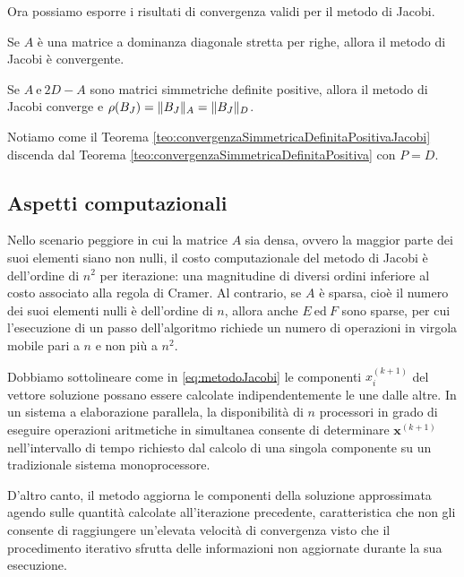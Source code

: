 Ora possiamo esporre i risultati di convergenza validi per il metodo di Jacobi.
\begin{teorema}
    \label{teo:convergenzaDominanzaDiagonaleStretta}
    Se $A$ \`e una matrice a dominanza diagonale stretta per righe, allora il metodo di Jacobi \`e convergente.
\end{teorema}
\begin{teorema}
    \label{teo:convergenzaSimmetricaDefinitaPositivaJacobi}
    Se $A \ \text{e} \ 2D - A$ sono matrici simmetriche definite positive, allora il metodo di Jacobi converge e $\rho(B_{J}) = \lVert B_{J}\rVert_{A} = \lVert B_{J}\rVert_{D}$.
\end{teorema}
Notiamo come il Teorema \ref{teo:convergenzaSimmetricaDefinitaPositivaJacobi} discenda dal Teorema \ref{teo:convergenzaSimmetricaDefinitaPositiva} con $P = D$.
\subsection{Aspetti computazionali}
Nello scenario peggiore in cui la matrice $A$ sia densa, ovvero la maggior parte dei suoi elementi siano non nulli,
il costo computazionale del metodo di Jacobi \`e dell'ordine di $n^{2}$ \si{\flops} per iterazione: una magnitudine di diversi ordini inferiore
al costo associato alla regola di Cramer.\newline
Al contrario, se $A$ \`e sparsa, cio\`e il numero dei suoi elementi nulli \`e dell'ordine di $n$, allora anche $E \ \text{ed} \ F$
sono sparse, per cui l'esecuzione di un passo dell'algoritmo richiede un numero di operazioni in virgola mobile pari a $n$ e non
pi\`u a $n^2$.

Dobbiamo sottolineare come in \eqref{eq:metodoJacobi} le componenti $x_{i}^{(k+1)}$ del vettore soluzione possano essere calcolate indipendentemente le une dalle altre. \newline
In un sistema a elaborazione parallela, la disponibilit\`a di $n$ processori in grado di eseguire operazioni aritmetiche in simultanea consente di determinare $\mathbf{x}^{(k+1)}$ nell'intervallo di tempo richiesto dal calcolo di una singola componente su un tradizionale sistema monoprocessore.

D'altro canto, il metodo aggiorna le componenti della soluzione approssimata agendo sulle quantit\`a calcolate all'iterazione precedente, caratteristica che non gli consente di raggiungere un'elevata velocit\`a di convergenza visto che il procedimento iterativo sfrutta delle informazioni non aggiornate durante la sua esecuzione.


